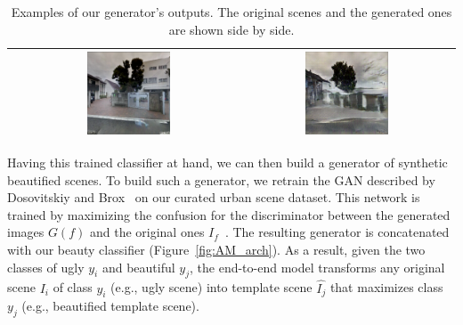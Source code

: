 \begin{table}
\begin{tabular}{l*2{c}@{}}
        & \includegraphics[width=0.4\textwidth]{Plot/GAN_examples/orig_3} & \includegraphics[width=0.4\textwidth]{Plot/GAN_examples/gan_3} \\ 
        
        
      \bottomrule 
    \end{tabular}
    \caption{Examples of our generator's outputs. The original scenes and the generated ones are shown side by side.}
    \label{fig:GanExample}
\end{table} 


Having this trained classifier at hand, we can then build a generator of synthetic beautified scenes. To build such a generator, we  retrain the GAN described by Dosovitskiy and Brox~\cite{dosovitskiy2016generating} on our curated urban scene dataset. This network is trained by maximizing the confusion for the discriminator between the generated images $G(f)$ and the original ones $I_f$~\cite{goodfellow2014generative}.  The resulting generator is concatenated with our beauty classifier (Figure~\ref{fig:AM_arch}). As a result, given the two classes of ugly $y_i$ and beautiful $y_j$, the end-to-end model  transforms any original scene $I_i$ of class $y_i$ (e.g., ugly scene) into template scene $\hat{I_j}$ that maximizes class $y_j$ (e.g., beautified template scene). 

%
%

